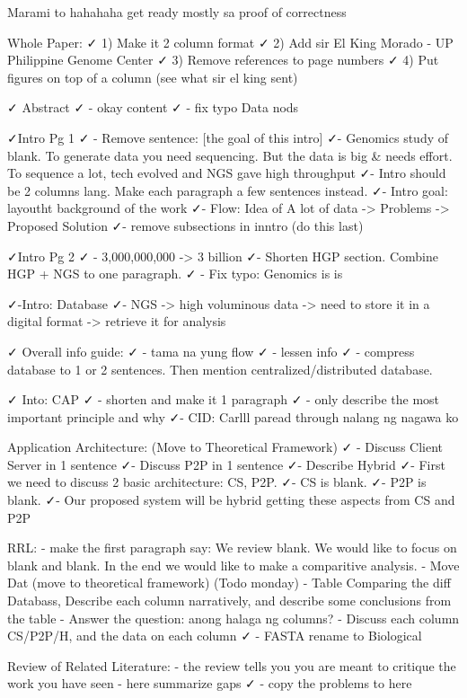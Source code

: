 Marami to hahahaha get ready mostly sa proof of correctness

Whole Paper:
✓ 1) Make it 2 column format
✓ 2) Add sir El King Morado - UP Philippine Genome Center
✓ 3) Remove references to page numbers
✓ 4) Put figures on top of a column (see what sir el king sent)

✓ Abstract
✓ - okay content
✓ - fix typo Data nods

✓Intro Pg 1
✓ - Remove sentence: [the goal of this intro]
✓- Genomics study of blank. To generate data you need sequencing. But the data is big & needs effort. To sequence a lot, tech evolved and NGS gave high throughput
✓- Intro should be 2 columns lang. Make each paragraph a few sentences instead.
✓- Intro goal: layoutht background of the work
✓- Flow: Idea of A lot of data -> Problems -> Proposed Solution
✓- remove subsections in inntro (do this last)


✓Intro Pg 2
✓ - 3,000,000,000 -> 3 billion
✓- Shorten HGP section. Combine HGP + NGS to one paragraph.
✓ - Fix typo: Genomics is is

✓-Intro: Database
✓- NGS -> high voluminous data -> need to store it in a digital format -> retrieve it for analysis


✓ Overall info guide: 
✓ - tama na yung flow
✓ - lessen info
✓ - compress database to 1 or 2 sentences. Then mention centralized/distributed database.

✓ Into: CAP
✓ - shorten and make it 1 paragraph
✓ - only describe the most important principle and why
✓- CID: Carlll paread through nalang ng nagawa ko

Application Architecture: (Move to Theoretical Framework)
✓ - Discuss Client Server in 1 sentence
✓- Discuss P2P in 1 sentence
✓- Describe Hybrid 
✓- First we need to discuss 2 basic architecture: CS, P2P. 
✓- CS is blank. 
✓- P2P is blank. 
✓- Our proposed system will be hybrid getting these aspects from CS and P2P

RRL:
- make the first paragraph say: We review blank. We would like to focus on blank and blank. In the end we would like to make a comparitive analysis. 
- Move Dat (move to theoretical framework)
(Todo monday) - Table Comparing the diff Databass, Describe each column narratively, and describe some conclusions from the table
- Answer the question: anong halaga ng columns? 
- Discuss each column CS/P2P/H, and the data on each column
✓ - FASTA rename to Biological

Review of Related Literature:
- the review tells you you are meant to critique the work you have seen
- here summarize gaps 
✓ - copy the problems to here


